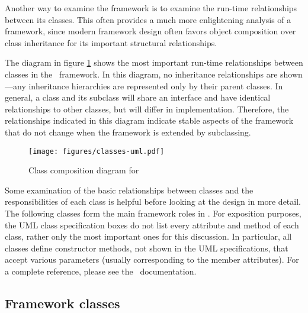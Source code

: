 Another way to examine the framework is to examine the run-time
relationships between its classes.  This often provides a much more
enlightening analysis of a framework, since modern framework design
often favors object composition over class inheritance for its
important structural relationships. \cite[p. 20]{gamma:95}

The diagram in figure \ref{classes-uml} shows the
most important run-time relationships between classes in the
\aicat\ framework.  In this diagram, no inheritance
relationships are shown---any inheritance hierarchies are represented
only by their parent classes.  In general, a class and its subclass
will share an interface and have identical relationships to other
classes, but will differ in implementation.  Therefore, the
relationships indicated in this diagram indicate stable aspects of the
framework that do not change when the framework is extended by
subclassing.

\begin{figure}
\texttt{[image: figures/classes-uml.pdf]}
\caption{Class composition diagram for \aicat}
\label{classes-uml}
\end{figure}

Some examination of the basic relationships between classes and the
responsibilities of each class is helpful before looking at the design
in more detail.  The following classes form the main framework roles
in \aicat.  For exposition purposes, the UML class specification boxes
do not list every attribute and method of each class, rather only the
most important ones for this discussion.  In particular, all classes
define  constructor methods, not shown in the UML
specifications, that accept various parameters (usually corresponding
to the member attributes).  For a complete reference, please see the
\aicat\ documentation.

\subsection{Framework classes}

